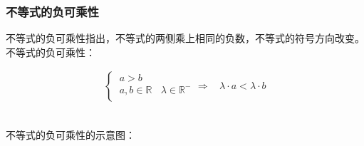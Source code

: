 \documentclass[UTF8]{ctexart}
\begin{document}
\newpage

\subsubsection{不等式的负可乘性}
    \setcounter{equation}{0}
    不等式的负可乘性指出，不等式的两侧乘上相同的负数，不等式的符号方向改变。\\[3mm]
    不等式的负可乘性：
    \begin{large}
        \begin{align*}
            \begin{cases}
                ~a>b\\[3mm]
                ~a,b\in\mathbb{R}~~~~\lambda\in\mathbb{R^-}\\
            \end{cases}
            \Longrightarrow~~~~\lambda\cdot a<\lambda\cdot b
        \end{align*}
    \end{large}\\[3mm]
    不等式的负可乘性的示意图：
\end{document}
